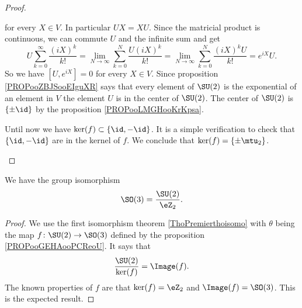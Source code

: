 \begin{proof}
\begin{subproof}
            for every \( X\in V\). In particular \( UX=XU\). Since the matricial product is continuous, we can commute \( U\) and the infinite sum and get
            \begin{equation}
                U\sum_{k=0}^{\infty}\frac{ (iX)^k }{ k! }=\lim_{N\to \infty} \sum_{k=0}^N\frac{ U(iX)^k }{ k! }=\lim_{N\to \infty} \sum_{k=0}^N\frac{ (iX)^kU }{ k! }= e^{iX}U.
            \end{equation}
            So we have \( [U, e^{iX}]=0\) for every \( X\in V\). Since proposition \ref{PROPooZBJSooEIguXR} says that every element of \( \SU(2)\) is the exponential of an element in \( V\) the element \( U\) is in the center of \( \SU(2)\). The center of \( \SU(2)\) is \( \{ \pm\id \}\) by the proposition \ref{PROPooLMGHooKrKpsa}.

            Until now we have \( \ker(f)\subset \{ \id,-\id \}\). It is a simple verification to check that \( \{ \id,-\id \}\) are in the kernel of \( f\). We conclude that \( \ker(f)=\{ \pm\mtu_2 \}\).
    \end{subproof}
\end{proof}

\begin{proposition}     \label{PROPooDKPTooBnLflt}
    We have the group isomorphism
    \begin{equation}
        \SO(3)=\frac{ \SU(2) }{ \eZ_2 }.
    \end{equation}
\end{proposition}

\begin{proof}
    We use the first isomorphism theorem \ref{ThoPremierthoisomo} with \( \theta\) being the map \( f\colon \SU(2)\to \SO(3)\) defined by the proposition \ref{PROPooGEHAooPCReoU}. It says that
    \begin{equation}
        \frac{ \SU(2) }{ \ker(f) }=\Image(f).
    \end{equation}
    The known properties of \( f\) are that \( \ker(f)=\eZ_2\) and \( \Image(f)=\SO(3)\). This is the expected result.
\end{proof}


